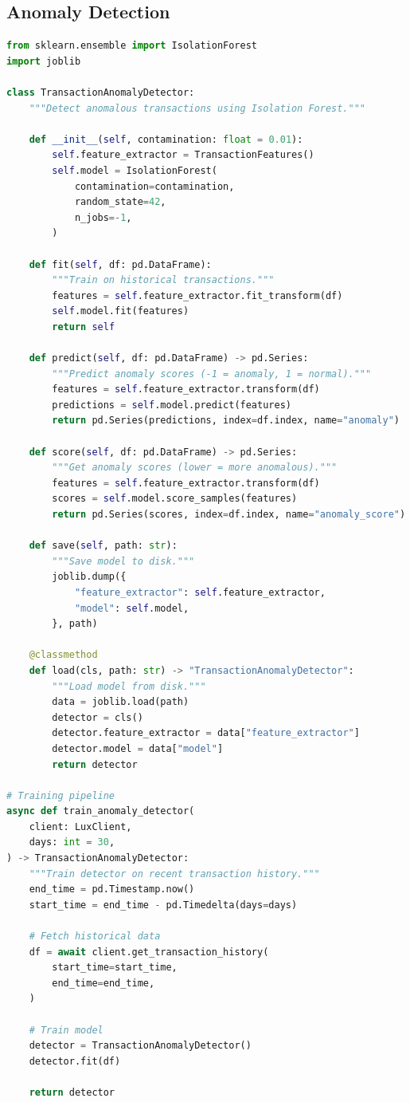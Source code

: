 \documentclass[11pt,twocolumn]{article}
\begin{document}
\subsection{Anomaly Detection}

\begin{lstlisting}[language=Python,caption=Anomaly Detection]
from sklearn.ensemble import IsolationForest
import joblib

class TransactionAnomalyDetector:
    """Detect anomalous transactions using Isolation Forest."""

    def __init__(self, contamination: float = 0.01):
        self.feature_extractor = TransactionFeatures()
        self.model = IsolationForest(
            contamination=contamination,
            random_state=42,
            n_jobs=-1,
        )

    def fit(self, df: pd.DataFrame):
        """Train on historical transactions."""
        features = self.feature_extractor.fit_transform(df)
        self.model.fit(features)
        return self

    def predict(self, df: pd.DataFrame) -> pd.Series:
        """Predict anomaly scores (-1 = anomaly, 1 = normal)."""
        features = self.feature_extractor.transform(df)
        predictions = self.model.predict(features)
        return pd.Series(predictions, index=df.index, name="anomaly")

    def score(self, df: pd.DataFrame) -> pd.Series:
        """Get anomaly scores (lower = more anomalous)."""
        features = self.feature_extractor.transform(df)
        scores = self.model.score_samples(features)
        return pd.Series(scores, index=df.index, name="anomaly_score")

    def save(self, path: str):
        """Save model to disk."""
        joblib.dump({
            "feature_extractor": self.feature_extractor,
            "model": self.model,
        }, path)

    @classmethod
    def load(cls, path: str) -> "TransactionAnomalyDetector":
        """Load model from disk."""
        data = joblib.load(path)
        detector = cls()
        detector.feature_extractor = data["feature_extractor"]
        detector.model = data["model"]
        return detector

# Training pipeline
async def train_anomaly_detector(
    client: LuxClient,
    days: int = 30,
) -> TransactionAnomalyDetector:
    """Train detector on recent transaction history."""
    end_time = pd.Timestamp.now()
    start_time = end_time - pd.Timedelta(days=days)

    # Fetch historical data
    df = await client.get_transaction_history(
        start_time=start_time,
        end_time=end_time,
    )

    # Train model
    detector = TransactionAnomalyDetector()
    detector.fit(df)

    return detector
\end{lstlisting}
\end{document}
